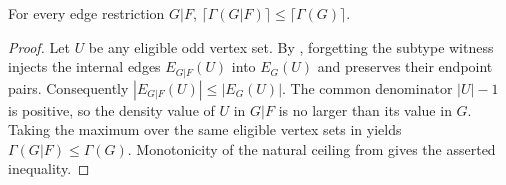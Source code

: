\begin{lemma}
For every edge restriction $G|F$,
$\lceil\Gamma(G|F)\rceil\le\lceil\Gamma(G)\rceil$.
\end{lemma}
\begin{proof}
Let $U$ be any eligible odd vertex set.  By
, forgetting the subtype witness injects the internal
edges $E_{G|F}(U)$ into $E_G(U)$ and preserves their endpoint pairs.
Consequently $|E_{G|F}(U)|\le |E_G(U)|$.  The common denominator
$|U|-1$ is positive, so the density value of $U$ in $G|F$ is no larger than
its value in $G$.  Taking the maximum over the same eligible vertex sets in
 yields $\Gamma(G|F)\le\Gamma(G)$.  Monotonicity of the
natural ceiling from  gives the asserted inequality.
\end{proof}
